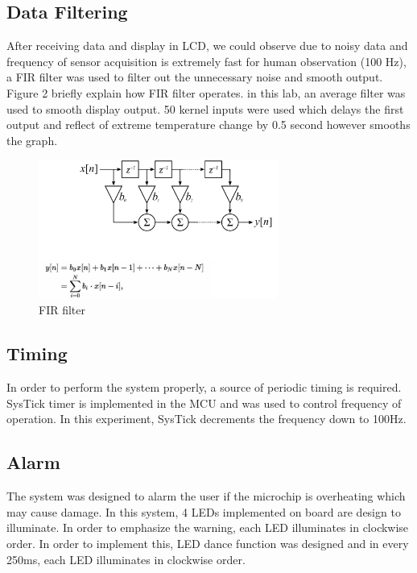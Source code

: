 \documentclass{article}
\begin{document}
\subsection{Data Filtering}
After receiving data and display in LCD, we could observe due to noisy data and frequency of sensor acquisition is extremely fast for human observation (100 Hz), a FIR filter was used to filter out the unnecessary noise and smooth output. Figure 2 briefly explain how FIR filter operates. in this lab, an average filter was used to smooth display output. 50 kernel inputs were used which delays the first output and reflect of extreme temperature change by 0.5 second however smooths the graph.

\begin{figure}[!htb]
\begin{center}
\includegraphics[width=0.70\textwidth]{FIR.png} %
\caption{FIR filter}
\end{center}
\end{figure}

\subsection{Timing}
In order to perform the system properly, a source of periodic timing is required. SysTick timer is implemented in the MCU and was used to control frequency of operation. In this experiment, SysTick decrements the frequency down to 100Hz. 

\subsection{Alarm}
The system was designed to alarm the user if the microchip is overheating which may cause damage. In this system, 4 LEDs implemented on board are design to illuminate. In order to emphasize the warning, each LED illuminates in clockwise order. In order to implement this, LED dance function was designed and in every 250ms, each LED illuminates in clockwise order.
\end{document}
